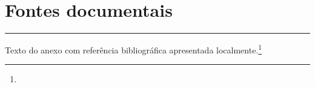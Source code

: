 \documentclass{abntexto-ufc}
\begin{document}
\textual

\section{Fontes documentais}

\begin{ufcobject}[here]
  \rule{6cm}{2cm}
\end{ufcobject}

Texto do anexo com referência bibliográfica apresentada localmente.\footnote{}
\end{document}
